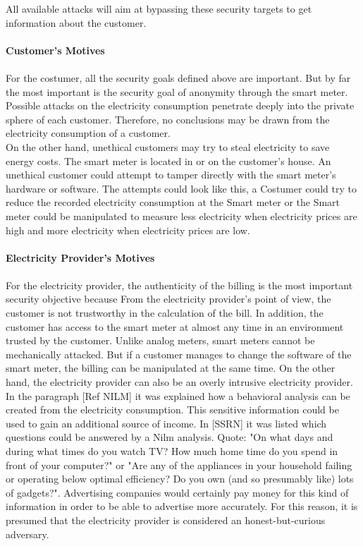  
All available attacks will aim at bypassing these security targets to get information about the customer. 
\\
\\
\textbf{Customer's Motives}
\\
\\
For the costumer, all the security goals defined above are important. But by far the most important is the security goal of anonymity through the smart meter. Possible attacks on the electricity consumption penetrate deeply into the private sphere of each customer. Therefore, no conclusions may be drawn from the electricity consumption of a customer.\\
On the other hand, unethical customers may try to steal electricity to save energy costs. The smart meter is located in or on the customer's house. An unethical customer could attempt to tamper directly with the smart meter's hardware or software. The attempts could look like this, a Costumer could try to reduce the recorded electricity consumption at the Smart meter or the Smart meter could be manipulated to measure less electricity when electricity prices are high and more electricity when electricity prices are low.
\\
\\
\textbf{Electricity Provider's Motives}
\\
\\
For the electricity provider, the authenticity of the billing is the most important security objective because From the electricity provider's point of view, the customer is not trustworthy in the calculation of the bill. In addition, the customer has access to the smart meter at almost any time in an environment trusted by the customer. Unlike analog meters, smart meters cannot be mechanically attacked. But if a customer manages to change the software of the smart meter, the billing can be manipulated at the same time. On the other hand, the electricity provider can also be an overly intrusive electricity provider. In the paragraph [Ref NILM] it was explained how a behavioral analysis can be created from the electricity consumption. This sensitive information could be used to gain an additional source of income. In [SSRN] it was listed which questions could be answered by a Nilm analysis. Quote: "On what days and during what times do you watch TV? How much home time do you spend in front of your computer?" or "Are any of the appliances in your household failing or operating below optimal efficiency? Do you own (and so presumably like) lots of gadgets?". Advertising companies would certainly pay money for this kind of information in order to be able to advertise more accurately. For this reason, it is presumed that the electricity provider is considered an honest-but-curious adversary. 
